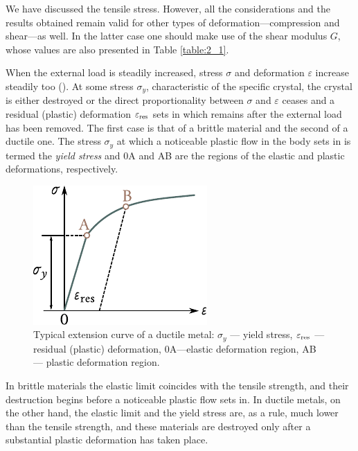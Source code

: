 We have discussed the tensile stress. However, all the considerations and the results obtained remain valid for other types of deformation---compression and shear---as well. In the latter case one should make use of the shear modulus $G$, whose values are also presented in Table \ref{table:2_1}.

When the external load is steadily increased, stress $\sigma$ and deformation $\varepsilon$ increase steadily too (). At some stress $\sigma_y$, characteristic of the specific crystal, the crystal is either destroyed or the direct proportionality between $\sigma$ and $\varepsilon$ ceases and a residual (plastic) deformation $\varepsilon_{\text{res}}$ sets in which remains after the external load has been removed. The first case is that of a brittle material and the second of a ductile one. The stress $\sigma_y$ at which a noticeable plastic flow in the body sets in is termed the \textit{yield stress} and $0$A and AB are the regions of the elastic and plastic deformations, respectively.

\begin{figure}[t]
	\begin{center}
		\includegraphics[scale=1.0]{figures/ch_02/fig_2_3.pdf}
		\caption[]{Typical extension curve of a ductile metal: $\sigma_y$ --- yield stress, $\varepsilon_{\text{res}}$ --- residual (plastic) deformation, $0$A---elastic deformation region, AB --- plastic deformation region.}
		\label{fig:2_3}
	\end{center}
	\vspace{-0.7cm}
\end{figure}

In brittle materials the elastic limit coincides with the tensile strength, and their destruction begins before a noticeable plastic flow sets in. In ductile metals, on the other hand, the elastic limit and the yield stress are, as a rule, much lower than the tensile strength, and these materials are destroyed only after a substantial plastic deformation has taken place.


